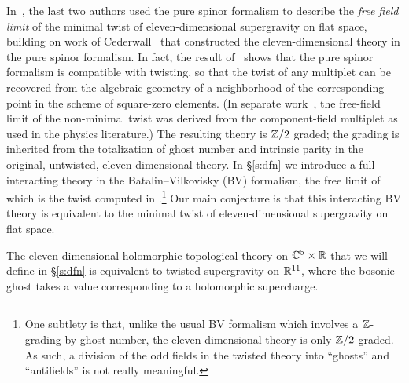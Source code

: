 In~\cite{SWspinor}, the last two authors used the pure spinor formalism to describe the {\em free field limit} of the minimal twist of eleven-dimensional supergravity on flat space, building on work of Cederwall~\cite{Ced-towards,Ced-11d} that constructed the eleven-dimensional theory in the pure spinor formalism. In fact, the result of~\cite{SWspinor} shows that the pure spinor formalism is compatible with twisting, so that the twist of any multiplet can be recovered from the algebraic geometry of a neighborhood of the corresponding point in the scheme of square-zero elements.
(In separate work~\cite{EagerHahner}, the free-field limit of the non-minimal twist was derived from the component-field multiplet as used in the physics literature.)
The resulting theory is $\mathbb Z/2$ graded; the grading is inherited from the totalization of ghost number and intrinsic parity in the original, untwisted, eleven-dimensional theory.
In \S\ref{s:dfn} we introduce a full interacting theory in the Batalin--Vilkovisky (BV) formalism, the free limit of which is the twist computed in \cite{SWspinor}.\footnote{One subtlety is that, unlike the usual BV formalism which involves a $\mathbb Z$-grading by ghost number, the eleven-dimensional theory is only $\mathbb Z/2$ graded.
As such, a division of the odd fields in the twisted theory into ``ghosts'' and ``antifields'' is not really meaningful.}
Our main conjecture is that this interacting BV theory is equivalent to the minimal twist of eleven-dimensional supergravity on flat space.

\begin{conj}
The eleven-dimensional  holomorphic-topological theory on $\mathbb C^5 \times \mathbb R$ that we will define in \S \ref{s:dfn} is equivalent to twisted supergravity on $\mathbb R^{11}$, where the bosonic ghost takes a value corresponding to a holomorphic supercharge. 
\end{conj}

